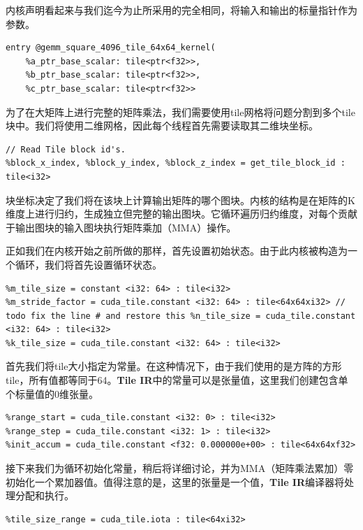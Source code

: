 \documentclass{article}
\begin{document}
内核声明看起来与我们迄今为止所采用的完全相同，将输入和输出的标量指针作为参数。


\begin{lstlisting}
entry @gemm_square_4096_tile_64x64_kernel(
    %a_ptr_base_scalar: tile<ptr<f32>>,
    %b_ptr_base_scalar: tile<ptr<f32>>,
    %c_ptr_base_scalar: tile<ptr<f32>>
\end{lstlisting}

为了在大矩阵上进行完整的矩阵乘法，我们需要使用tile网格将问题分割到多个tile块中。我们将使用二维网格，因此每个线程首先需要读取其二维块坐标。


\begin{lstlisting}
// Read Tile block id's.
%block_x_index, %block_y_index, %block_z_index = get_tile_block_id : tile<i32>
\end{lstlisting}

块坐标决定了我们将在该块上计算输出矩阵的哪个图块。内核的结构是在矩阵的K维度上进行归约，生成独立但完整的输出图块。它循环遍历归约维度，对每个贡献于输出图块的输入图块执行矩阵乘加（MMA）操作。


正如我们在内核开始之前所做的那样，首先设置初始状态。由于此内核被构造为一个循环，我们将首先设置循环状态。


\begin{lstlisting}
%m_tile_size = constant <i32: 64> : tile<i32>
%m_stride_factor = cuda_tile.constant <i32: 64> : tile<64x64xi32> // todo fix the line # and restore this %n_tile_size = cuda_tile.constant <i32: 64> : tile<i32>
%k_tile_size = cuda_tile.constant <i32: 64> : tile<i32>
\end{lstlisting}

首先我们将tile大小指定为常量。在这种情况下，由于我们使用的是方阵的方形tile，所有值都等同于64。\textbf{Tile IR}中的常量可以是张量值，这里我们创建包含单个标量值的0维张量。


\begin{lstlisting}
%range_start = cuda_tile.constant <i32: 0> : tile<i32>
%range_step = cuda_tile.constant <i32: 1> : tile<i32>
%init_accum = cuda_tile.constant <f32: 0.000000e+00> : tile<64x64xf32>
\end{lstlisting}

接下来我们为循环初始化常量，稍后将详细讨论，并为MMA（矩阵乘法累加）零初始化一个累加器值。值得注意的是，这里的张量是一个值，\textbf{Tile IR}编译器将处理分配和执行。


\begin{lstlisting}
%tile_size_range = cuda_tile.iota : tile<64xi32>
\end{lstlisting}
\end{document}
